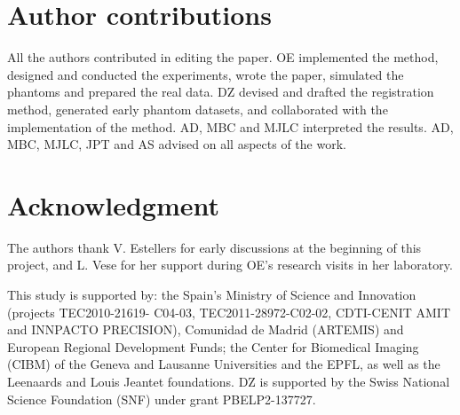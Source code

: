 \section*{Author contributions}
All the authors contributed in editing the paper.
OE implemented the method, designed and conducted the experiments, wrote the paper,
  simulated the phantoms and prepared the real data.
DZ devised and drafted the registration method, generated early phantom datasets, and
  collaborated with the implementation of the method.
AD, MBC and MJLC interpreted the results.
AD, MBC, MJLC, JPT and AS advised on all aspects of the work.

\section*{Acknowledgment}
The authors thank V. Estellers for early discussions at the beginning of this project,
  and L. Vese for her support during OE's research visits in her laboratory.

This study is supported by: the Spain's Ministry of Science and Innovation
  (projects TEC2010-21619- C04-03, TEC2011-28972-C02-02, CDTI-CENIT
  AMIT and INNPACTO PRECISION), Comunidad de Madrid (ARTEMIS) and
  European Regional Development Funds; the Center for Biomedical Imaging
  (CIBM) of the Geneva and Lausanne Universities and the EPFL, as well as the
  Leenaards and Louis Jeantet foundations.
DZ is supported by the Swiss National Science Foundation (SNF) under grant PBELP2-137727.
